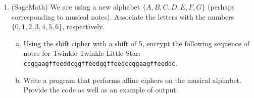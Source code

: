 \documentclass[12pt]{amsart}
\theoremstyle{plain}
\theoremstyle{definition}
\begin{document}
\begin{enumerate}[1.]
	\item (SageMath) We are using a new alphabet $\{A,B,C,D,E,F,G\}$ (perhaps corresponding to musical notes).  Associate the letters with the numbers $\{0,1,2,3,4,5,6\}$, respectively.\\
		\begin{enumerate}[a.]
			\item Using the shift cipher with a shift of 5, encrypt the following sequence of notes for Twinkle Twinkle Little Star: \texttt{ccggaagffeeddcggffeedggffeedccggaagffeeddc}.\\
			\item Write a program that performs affine ciphers on the musical alphabet.  Provide the code as well as an example of output.\\
		\end{enumerate}
\end{enumerate}

	
\end{document}

